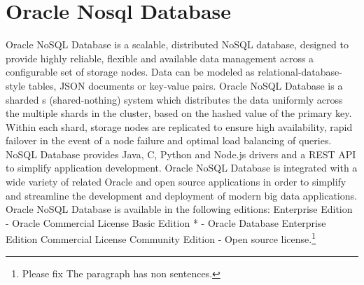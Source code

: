 \section{Oracle Nosql Database}

Oracle NoSQL Database\cite{hid-sp18-515-www-oraclenosql} is a 
scalable, distributed NoSQL database, designed to provide highly 
reliable, flexible and available data management across a 
configurable set of storage nodes.
Data can be modeled as relational-database-style tables, JSON 
documents or key-value pairs. Oracle NoSQL Database is a sharded 
s (shared-nothing) system which distributes the data uniformly across 
the multiple shards in the cluster, based on the hashed value of the 
primary key. Within each shard, storage nodes are replicated to ensure 
high availability, rapid failover in the event of a node failure and 
optimal load balancing of queries. NoSQL Database provides Java, C, 
Python and Node.js drivers and a REST API to simplify application 
development. Oracle NoSQL Database is integrated with a wide variety 
of related Oracle and open source applications in order to simplify 
and streamline the development and deployment of modern big data 
applications. Oracle NoSQL Database is available in the following 
editions: 
Enterprise Edition - Oracle Commercial License
Basic Edition * - Oracle Database Enterprise Edition Commercial 
License
Community Edition - Open source license.\footnote{Please fix The paragraph has non sentences.}
